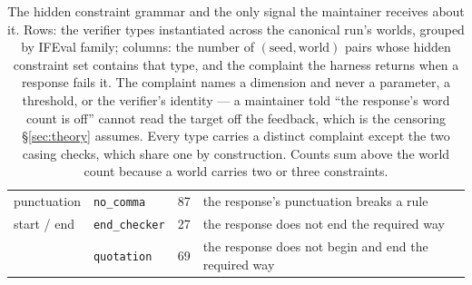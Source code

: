 \begin{table}[t]
\begin{tabular}{@{}llr>{\raggedright\arraybackslash}p{}@{}}
    \addlinespace
    punctuation & \texttt{no\_comma} & 87 & the response's punctuation breaks a rule \\
    \addlinespace
    start / end & \texttt{end\_checker} & 27 & the response does not end the required way \\
     & \texttt{quotation} & 69 & the response does not begin and end the required way \\
    \bottomrule
  \end{tabular}
  \caption{
    The hidden constraint grammar and the only signal the maintainer receives about it. Rows: the
    verifier types instantiated across the canonical run's worlds, grouped by IFEval family;
    columns: the number of $(\text{seed}, \text{world})$ pairs whose hidden constraint set contains
    that type, and the complaint the harness returns when a response fails it. The complaint names
    a dimension and never a parameter, a threshold, or the verifier's identity --- a maintainer
    told ``the response's word count is off'' cannot read the target off the feedback, which is
    the censoring \S\ref{sec:theory} assumes. Every type carries a distinct complaint except the
    two casing checks, which share one by construction. Counts sum above the world count because
    a world carries two or three constraints.
  }
  \label{tab:verifiers}
\end{table}
